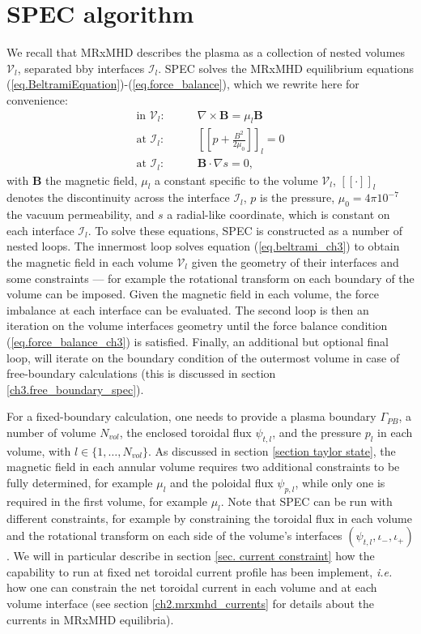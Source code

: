 \documentclass[my_thesis.tex]{subfiles}
\begin{document}
\section{SPEC algorithm \label{sec. spec_algorithm}} 
We recall that MRxMHD describes the plasma as a collection of nested volumes $\mathcal{V}_l$, separated bby interfaces $\mathcal{I}_l$. SPEC solves the MRxMHD equilibrium equations (\ref{eq.BeltramiEquation})-(\ref{eq.force_balance}), which we rewrite here for convenience:
\begin{align}
	\text{in }\mathcal{V}_l:\qquad &\nabla\times\mathbf{B}=\mu_l\mathbf{B}\label{eq.beltrami_ch3}\\
	\text{at }\mathcal{I}_l:\qquad &\left[\left[p + \frac{B^2}{2\mu_0}\right]\right]_l = 0\label{eq.force_balance_ch3}\\
	\text{at }\mathcal{I}_l:\qquad & \mathbf{B}\cdot \nabla s = 0,
\end{align}
with $\mathbf{B}$ the magnetic field, $\mu_l$ a constant specific to the volume $\mathcal{V}_l$, $[[\cdot]]_l$ denotes the discontinuity across the interface $\mathcal{I}_l$, $p$ is the pressure, $\mu_0=4\pi 10^{-7}$ the vacuum permeability, and $s$ a radial-like coordinate, which is constant on each interface $\mathcal{I}_l$. To solve these equations, SPEC is constructed as a number of nested loops. The innermost loop solves equation (\ref{eq.beltrami_ch3}) to obtain the magnetic field in each volume $\mathcal{V}_l$ given the geometry of their interfaces and some constraints --- for example the rotational transform on each boundary of the volume can be imposed. Given the magnetic field in each volume, the force imbalance at each interface can be evaluated. The second loop is then an iteration on the volume interfaces geometry until the force balance condition (\ref{eq.force_balance_ch3}) is satisfied. Finally, an additional but optional final loop, will iterate on the boundary condition of the outermost volume in case of free-boundary calculations (this is discussed in section \ref{ch3.free_boundary_spec}).

For a fixed-boundary calculation, one needs to provide a plasma boundary $\Gamma_{PB}$, a number of volume $N_{vol}$, the enclosed toroidal flux $\psi_{t,l}$, and the pressure $p_l$ in each volume, with $l\in\{1,\ldots,N_{vol}\}$. As discussed in section \ref{section taylor state}, the magnetic field in each annular volume requires two additional constraints to be fully determined, for example $\mu_l$ and the poloidal flux $\psi_{p,l}$, while only one is required in the first volume, for example $\mu_l$. Note that \ac{SPEC} can be run with different constraints, for example by constraining the toroidal flux in each volume and the rotational transform on each side of the volume's interfaces $(\psi_{t,l},\iota_-,\iota_+)$. We will in particular describe in section \ref{sec. current constraint} how the capability to run at fixed net toroidal current profile has been implement, \textit{i.e.} how one can constrain the net toroidal current in each volume and at each volume interface (see section \ref{ch2.mrxmhd_currents} for details about the currents in MRxMHD equilibria).
\end{document}
